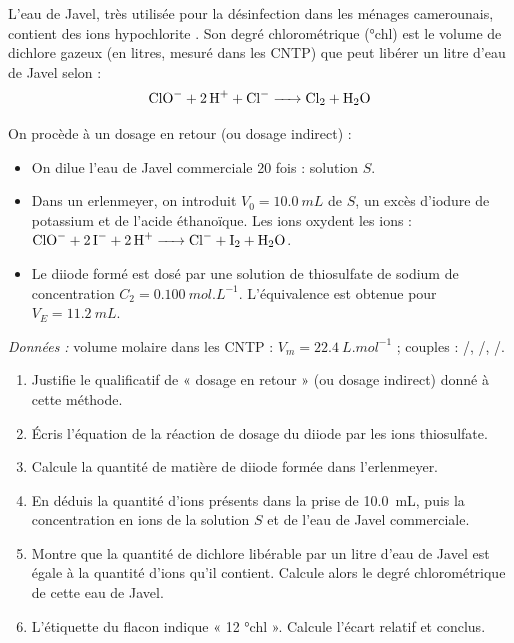 \documentclass[11pt]{article}
\newcommand{\cle}[1]{{\popxbold\color{popdark}#1}}
\begin{document}
\begin{exercice}
L'eau de Javel, très utilisée pour la désinfection dans les ménages camerounais, contient des ions hypochlorite . Son \cle{degré chlorométrique} (°chl) est le volume de dichlore gazeux (en litres, mesuré dans les CNTP) que peut libérer un litre d'eau de Javel selon :
\[ \ce{ClO- + 2H+ + Cl- -> Cl2 + H2O} \]

On procède à un \cle{dosage en retour} (ou dosage indirect) :
\begin{itemize}
\item On dilue l'eau de Javel commerciale 20 fois : solution $S$.
\item Dans un erlenmeyer, on introduit $V_0 = \SI{10,0}{mL}$ de $S$, un excès d'iodure de potassium et de l'acide éthanoïque. Les ions  oxydent les ions  : $\ce{ClO- + 2I- + 2H+ -> Cl- + I2 + H2O}$.
\item Le diiode formé est dosé par une solution de thiosulfate de sodium de concentration $C_2 = \SI{0,100}{mol.L^{-1}}$. L'équivalence est obtenue pour $V_E = \SI{11,2}{mL}$.
\end{itemize}

\emph{Données :} volume molaire dans les CNTP : $V_m = \SI{22,4}{L.mol^{-1}}$ ; couples : /, /, /.

\begin{enumerate}
\item Justifie le qualificatif de « dosage en retour » (ou dosage indirect) donné à cette méthode.
\item Écris l'équation de la réaction de dosage du diiode par les ions thiosulfate.
\item Calcule la quantité de matière de diiode formée dans l'erlenmeyer.
\item En déduis la quantité d'ions  présents dans la prise de \SI{10,0}{mL}, puis la concentration en ions  de la solution $S$ et de l'eau de Javel commerciale.
\item Montre que la quantité de dichlore libérable par un litre d'eau de Javel est égale à la quantité d'ions  qu'il contient. Calcule alors le degré chlorométrique de cette eau de Javel.
\item L'étiquette du flacon indique « 12 °chl ». Calcule l'écart relatif et conclus.
\end{enumerate}
\end{exercice}
\end{document}
